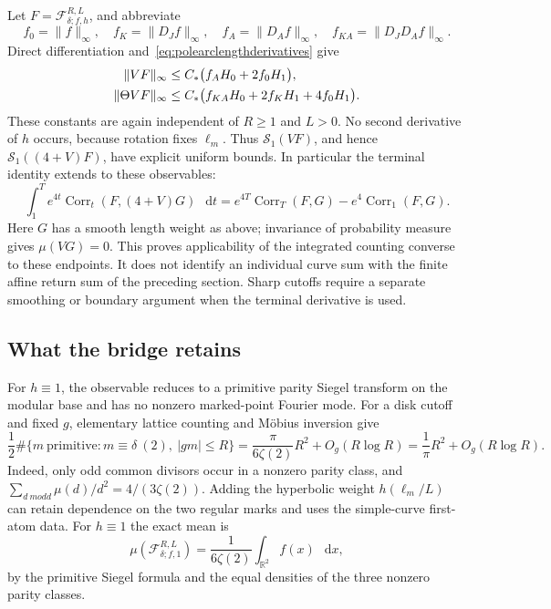 \documentclass[11pt,a4paper]{article}
\numberwithin{equation}{section}
\theoremstyle{definition}
\theoremstyle{remark}
\newcommand{\dd}{\mathop{}\!\mathrm d}
\newcommand{\RR}{\mathbb R}
\begin{document}
Let $F=\mathcal F_{\delta;f,h}^{R,L}$, and abbreviate
\[
 f_0=\|f\|_\infty,\quad f_K=\|D_Jf\|_\infty,\quad
 f_A=\|D_Af\|_\infty,\quad f_{KA}=\|D_JD_Af\|_\infty.
\]
Direct differentiation and~\eqref{eq:polearclengthderivatives} give
\begin{align}
 \|VF\|_\infty
  &\leq C_*\bigl(f_AH_0+2f_0H_1\bigr),\notag\\
 \|\Theta VF\|_\infty
  &\leq C_*\bigl(f_{KA}H_0+2f_KH_1+4f_0H_1\bigr).
 \label{eq:polearcVnorms}
\end{align}
These constants are again independent of $R\geq1$ and $L>0$.
No second derivative of $h$ occurs, because rotation fixes $\ell_m$.
Thus $\mathcal S_1(VF)$, and hence $\mathcal S_1((4+V)F)$, have explicit
uniform bounds. In particular the terminal identity extends to these
observables:
\begin{equation}
 \int_1^T e^{4t}\operatorname{Corr}_t(F,(4+V)G)\,\dd t
 =e^{4T}\operatorname{Corr}_T(F,G)
   -e^4\operatorname{Corr}_1(F,G).
 \label{eq:polearcterminalidentity}
\end{equation}
Here $G$ has a smooth length weight as above; invariance of probability
measure gives $\mu(VG)=0$. This proves applicability of the integrated
counting converse to these endpoints. It does not identify an individual
curve sum with the finite affine return sum of the preceding section.
Sharp cutoffs require a separate smoothing or boundary argument when
the terminal derivative is used.

\subsection{What the bridge retains}
\label{subsec:polearcscope}

For $h\equiv1$, the observable reduces to a primitive parity Siegel
transform on the modular base and has no nonzero marked-point Fourier
mode. For a disk cutoff and fixed $g$, elementary lattice counting and
M\"obius inversion give
\[
 \frac12\#\{m\ \mathrm{primitive}:m\equiv\delta\ (2),\ |gm|\leq R\}
 =\frac{\pi}{6\zeta(2)}R^2+O_g(R\log R)
 =\frac1\pi R^2+O_g(R\log R).
\]
Indeed, only odd common divisors occur in a nonzero parity class, and
$\sum_{d\ {
m odd}}\mu(d)/d^2=4/(3\zeta(2))$. Adding the hyperbolic
weight $h(\ell_m/L)$ can retain dependence on the two regular marks and
uses the simple-curve first-atom data. For $h\equiv1$ the exact mean is
\[
 \mu(\mathcal F_{\delta;f,1}^{R,L})
 =\frac1{6\zeta(2)}\int_{\RR^2}f(x)\,\dd x,
\]
by the primitive Siegel formula and the equal densities of the three
nonzero parity classes.
\end{document}
